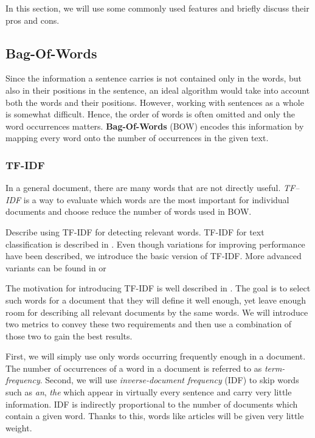 In this section, we will use some commonly used features and briefly discuss their pros and cons.

\subsection{Bag-Of-Words}
\label{subsec:bow}

Since the information a sentence carries is not contained only in the words, but also in their positions in the sentence, an ideal algorithm would take into account both the words and their positions.
However, working with sentences as a whole is somewhat difficult. Hence, the order of words is often omitted and only the word occurrences matters.
\textbf{Bag-Of-Words} (BOW) encodes this information by mapping every word onto the number of occurrences in the given text.

\subsubsection{TF-IDF}

In a general document, there are many words that are not directly useful.
{\it TF--IDF} is a way to evaluate which words are the most important for individual documents and
choose reduce the number of words used in BOW.

\citet{ramos2003using} Describe using TF-IDF for detecting relevant words.
TF-IDF for text classification is described in \citet{trstenjak2014knn}.
Even though variations for improving performance have been described,
we introduce the basic version of TF-IDF.
More advanced variants can be found in \citet{berger2000bridging} or
\citet{yun2005improved}

The motivation for introducing TF-IDF is well described in \citet{SalBuc88}.
The goal is to select such words for a document
that they will define it well enough, yet leave enough room for describing all relevant documents by the same words.
We will introduce two metrics to convey these two requirements and then use a combination of those two to gain the best results.

First, we will simply use only words occurring frequently enough in a document.
The number of occurrences of a word in a document is referred to as {\it term-frequency}.
Second, we will use {\it inverse-document frequency} (IDF) to skip words such as {\it an}, {\it the} which appear in virtually every sentence and carry very little information.
IDF is indirectly proportional to the number of documents which contain a given word.
Thanks to this, words like articles will be given very little weight.

